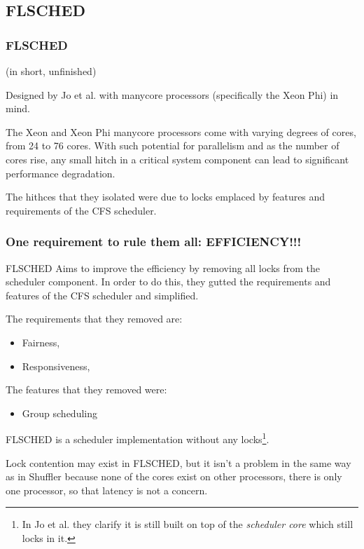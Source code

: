 \documentclass{beamer}
\newcommand{\linespace}{\vskip 0.25cm}
\begin{document}
\subsection{FLSCHED}
\begin{frame}
\frametitle{FLSCHED}

(in short, unfinished)

Designed by Jo et al. with manycore processors (specifically the Xeon Phi) in mind.

\linespace

The Xeon and Xeon Phi manycore processors come with varying degrees of cores, from 24 to 76 cores. With such potential for parallelism and as the number of cores rise, any small hitch in a critical system component can lead to significant performance degradation. 

The hithces that they isolated were due to locks emplaced by features and requirements of the CFS scheduler.

\end{frame}

\begin{frame}
\frametitle{One requirement to rule them all: EFFICIENCY!!!}

FLSCHED Aims to improve the efficiency by removing all locks from the scheduler component. In order to do this, they gutted the requirements and features of the CFS scheduler and simplified.

\linespace

The requirements that they removed are:

\begin{itemize}
\item Fairness,
\item Responsiveness,
\end{itemize}

The features that they removed were:

\begin{itemize}
\item Group scheduling
\end{itemize}

\end{frame}

\begin{frame}
FLSCHED is a scheduler implementation without any locks\footnote{In Jo et al. they clarify it is still built on top of the \emph{scheduler core} which still locks in it.}.

\linespace
Lock contention may exist in FLSCHED, but it isn't a problem in the same way as in Shuffler because none of the cores exist on other processors, there is only one processor, so that latency is not a concern.

\end{frame}
\end{document}
